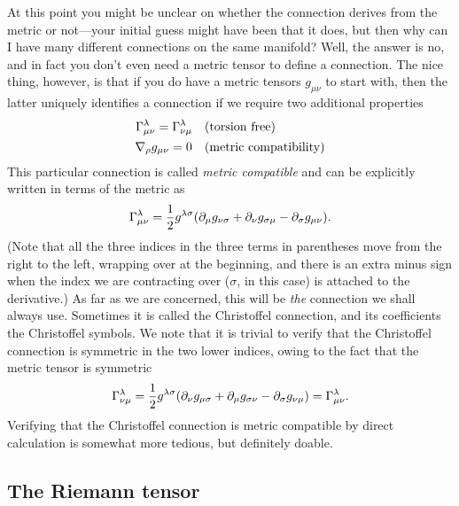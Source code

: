 At this point you might be unclear on whether the connection derives from the metric
or not---your initial guess might have been that it does, but then why can I have
many different connections on the same manifold? Well, the answer is no, and in
fact you don't even need a metric tensor to define a connection. The nice thing,
however, is  that if you do have a metric tensors $g_{\mu\nu}$ to start with, then
the latter uniquely identifies a connection if we require two additional properties
\begin{align*}
  \Gamma^{\lambda}_{\mu\nu} = \Gamma^{\lambda}_{\nu\mu} & \quad
  \text{(torsion free)}\\
  \nabla_\rho g_{\mu\nu} = 0 & \quad \text{(metric compatibility)}
\end{align*}
This particular connection is called \emph{metric compatible} and can be explicitly
written in terms of the metric as
\begin{align}
  \Gamma^{\lambda}_{\mu\nu} = \frac{1}{2}g^{\lambda\sigma}
  (\partial_{\mu}g_{\nu\sigma} + \partial_{\nu}g_{\sigma\mu} - \partial_{\sigma}g_{\mu\nu}).
\end{align}
(Note that all the three indices in the three terms in parentheses move from the
right to the left, wrapping over at the beginning, and there is an extra minus sign
when the index we are contracting over ($\sigma$, in this case) is attached to the
derivative.) As far as we are concerned, this will be \emph{the} connection we shall
always use. Sometimes it is called the Christoffel connection, and its
coefficients the Christoffel symbols. We note that it is trivial to verify that the
Christoffel connection is symmetric in the two lower indices, owing to the fact
that the metric tensor is symmetric
\begin{align*}
  \Gamma^{\lambda}_{\nu\mu} = \frac{1}{2}g^{\lambda\sigma}
  (\partial_{\nu}g_{\mu\sigma} + \partial_{\mu}g_{\sigma\nu} - \partial_{\sigma}g_{\nu\mu}) =
  \Gamma^{\lambda}_{\mu\nu}.
\end{align*}
Verifying that the Christoffel connection is metric compatible by direct calculation
is somewhat more tedious, but definitely doable.



\subsection{The Riemann tensor}

